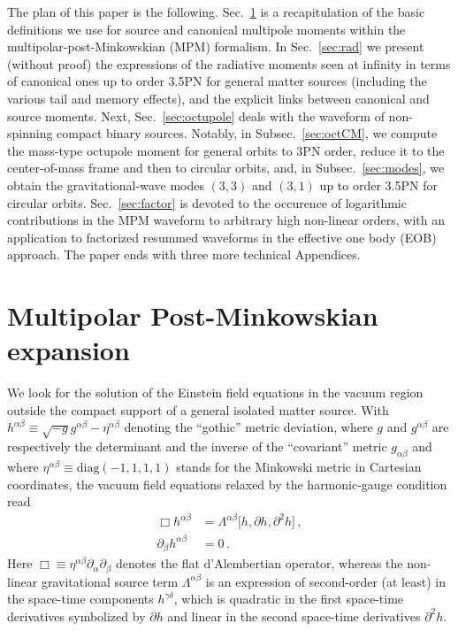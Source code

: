 \documentclass[prd,preprint,superscriptaddress,tightenlines,nofootinbib,
  eqsecnum,showpacs]{revtex4}
\begin{document}
The plan of this paper is the following. Sec.~\ref{sec:MPM} is a
recapitulation of the basic definitions we use for source and
canonical multipole moments within the multipolar-post-Minkowskian
(MPM) formalism. In Sec.~\ref{sec:rad} we present (without proof) the
expressions of the radiative moments seen at infinity in terms of
canonical ones up to order 3.5PN for general matter sources (including
the various tail and memory effects), and the explicit links between
canonical and source moments. Next, Sec.~\ref{sec:octupole} deals with
the waveform of non-spinning compact binary sources. Notably, in
Subsec.~\ref{sec:octCM}, we compute the mass-type octupole moment for
general orbits to 3PN order, reduce it to the center-of-mass frame and
then to circular orbits, and, in Subsec.~\ref{sec:modes}, we obtain
the gravitational-wave modes $(3,3)$ and $(3,1)$ up to order 3.5PN for
circular orbits. Sec.~\ref{sec:factor} is devoted to the occurence of
logarithmic contributions in the MPM waveform to arbitrary high
non-linear orders, with an application to factorized resummed
waveforms in the effective one body (EOB) approach. The paper ends
with three more technical Appendices.

\section{Multipolar Post-Minkowskian expansion} 
\label{sec:MPM}

We look for the solution of the Einstein field equations in the vacuum
region outside the compact support of a general isolated matter
source. With
$h^{\alpha\beta}\equiv\sqrt{-g}g^{\alpha\beta}-\eta^{\alpha\beta}$
denoting the ``gothic'' metric deviation, where $g$ and
$g^{\alpha\beta}$ are respectively the determinant and the inverse of
the ``covariant'' metric $g_{\alpha\beta}$ and where
$\eta^{\alpha\beta}\equiv\text{diag}(-1,1,1,1)$ stands for the
Minkowski metric in Cartesian coordinates, the vacuum field equations
relaxed by the harmonic-gauge condition read
%
\begin{subequations}\label{EFE}
\begin{align}
\Box h^{\alpha\beta} &= \Lambda^{\alpha\beta}\bigl[h, \partial h,
  \partial^2h\bigr]\,,\label{EFEa}\\ \partial_\beta h^{\alpha\beta} &=
0\,.\label{EFEb}
\end{align}\end{subequations}
%
Here $\Box\equiv\eta^{\alpha\beta}\partial_\alpha\partial_\beta$
denotes the flat d'Alembertian operator, whereas the non-linear
gravitational source term $\Lambda^{\alpha\beta}$ is an expression of
second-order (at least) in the space-time components
$h^{\gamma\delta}$, which is quadratic in the first space-time
derivatives symbolized by $\partial h$ and linear in the second
space-time derivatives $\partial^2h$.
\end{document}
